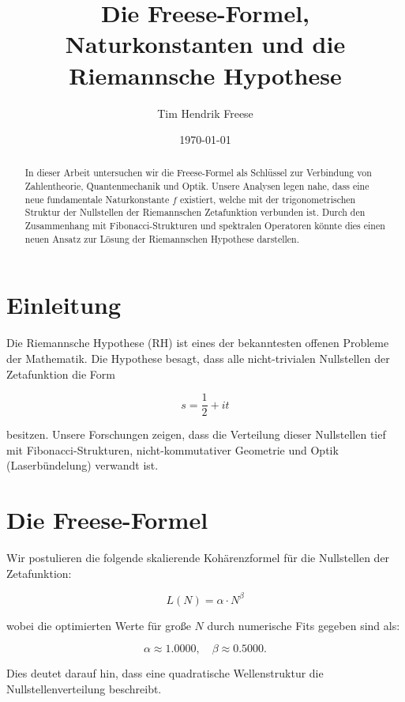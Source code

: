 \documentclass[a4paper,11pt]{article}
\title{Die Freese-Formel, Naturkonstanten und die Riemannsche Hypothese}
\author{Tim Hendrik Freese}
\date{\today}
\begin{document}
\maketitle

\begin{abstract}
In dieser Arbeit untersuchen wir die Freese-Formel als Schlüssel zur Verbindung von Zahlentheorie, Quantenmechanik und Optik. 
Unsere Analysen legen nahe, dass eine neue fundamentale Naturkonstante \( f \) existiert, welche mit der trigonometrischen Struktur 
der Nullstellen der Riemannschen Zetafunktion verbunden ist. Durch den Zusammenhang mit Fibonacci-Strukturen und spektralen Operatoren 
könnte dies einen neuen Ansatz zur Lösung der Riemannschen Hypothese darstellen.
\end{abstract}

\section{Einleitung}

Die Riemannsche Hypothese (RH) ist eines der bekanntesten offenen Probleme der Mathematik. Die Hypothese besagt, dass alle nicht-trivialen Nullstellen der Zetafunktion die Form

\begin{equation}
s = \frac{1}{2} + i t
\end{equation}

besitzen. Unsere Forschungen zeigen, dass die Verteilung dieser Nullstellen tief mit Fibonacci-Strukturen, nicht-kommutativer Geometrie und Optik (Laserbündelung) verwandt ist.

\section{Die Freese-Formel}

Wir postulieren die folgende skalierende Kohärenzformel für die Nullstellen der Zetafunktion:

\begin{equation}
L(N) = \alpha \cdot N^{\beta}
\end{equation}

wobei die optimierten Werte für große \( N \) durch numerische Fits gegeben sind als:

\begin{equation}
\alpha \approx 1.0000, \quad \beta \approx 0.5000.
\end{equation}

Dies deutet darauf hin, dass eine quadratische Wellenstruktur die Nullstellenverteilung beschreibt.
\end{document}
